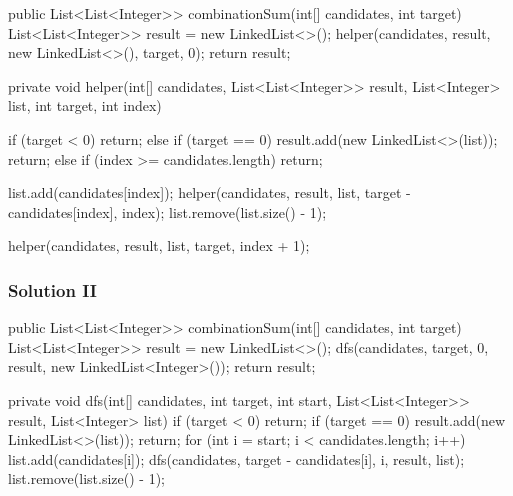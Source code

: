 \begin{Code}
public List<List<Integer>> combinationSum(int[] candidates, int target) {
    List<List<Integer>> result = new LinkedList<>();
    helper(candidates, result, new LinkedList<>(), target, 0);
    return result;
}

private void helper(int[] candidates, List<List<Integer>> result, List<Integer> list, int target, int index) {
    if (target < 0) {
        return;
    } else if (target == 0) {
        result.add(new LinkedList<>(list));
        return;
    } else if (index >= candidates.length) {
        return;
    }

    list.add(candidates[index]);
    helper(candidates, result, list, target - candidates[index], index);
    list.remove(list.size() - 1);

    helper(candidates, result, list, target, index + 1);
}

\end{Code}

\newpage

\subsubsection{Solution II}

\begin{Code}

public List<List<Integer>> combinationSum(int[] candidates, int target) {
    List<List<Integer>> result = new LinkedList<>();
    dfs(candidates, target, 0, result, new LinkedList<Integer>());
    return result;
}

private void dfs(int[] candidates, int target, int start, List<List<Integer>> result, List<Integer> list) {
    if (target < 0) {
        return;
    }
    if (target == 0) {
        result.add(new LinkedList<>(list));
        return;
    }
    for (int i = start; i < candidates.length; i++) {
        list.add(candidates[i]);
        dfs(candidates, target - candidates[i], i, result, list);
        list.remove(list.size() - 1);
    }
}
\end{Code}